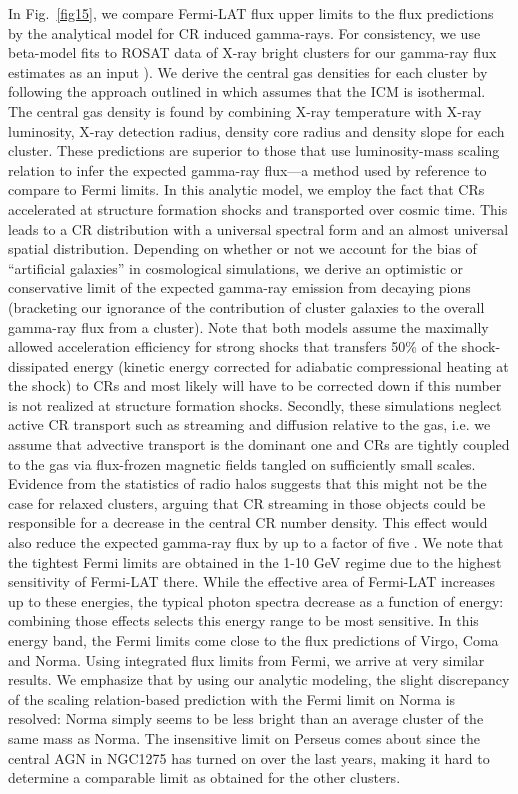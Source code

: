 \documentclass[10pt,aps,pra,reprint,amsmath,amsfonts,amssymb,showpacs,nofootinbib,floatfix]{revtex4-1}
\begin{document}
In Fig.~\ref{fig15}, we compare Fermi-LAT flux upper limits to the
flux predictions by the analytical model \cite{2010MNRAS.409..449P}
for CR induced gamma-rays. For consistency, we use beta-model fits to
ROSAT data of X-ray bright clusters for our gamma-ray flux estimates
as an input \cite{2002ApJ...567..716R}). We derive the central gas
densities for each cluster by following the approach outlined in
\cite{1999ApJ...517..627M} which assumes that the ICM is
isothermal. The central gas density is found by combining X-ray
temperature with X-ray luminosity, X-ray detection radius, density
core radius and density slope for each cluster. These predictions are
superior to those that use luminosity-mass scaling relation to infer
the expected gamma-ray flux---a method used by reference
\cite{2010ApJ...717L..71A} to compare to Fermi limits.  In this
analytic model, we employ the fact that CRs accelerated at structure
formation shocks and transported over cosmic time. This leads to a CR
distribution with a universal spectral form and an almost universal
spatial distribution. Depending on whether or not we account for the
bias of ``artificial galaxies'' in cosmological simulations, we derive
an optimistic or conservative limit of the expected gamma-ray emission
from decaying pions (bracketing our ignorance of the contribution of
cluster galaxies to the overall gamma-ray flux from a cluster). Note
that both models assume the maximally allowed acceleration efficiency
for strong shocks that transfers 50\% of the shock-dissipated energy
(kinetic energy corrected for adiabatic compressional heating at the
shock) to CRs and most likely will have to be corrected down if this
number is not realized at structure formation shocks. Secondly, these
simulations neglect active CR transport such as streaming and
diffusion relative to the gas, i.e. we assume that advective transport
is the dominant one and CRs are tightly coupled to the gas via
flux-frozen magnetic fields tangled on sufficiently small
scales. Evidence from the statistics of radio halos suggests that this
might not be the case for relaxed clusters, arguing that CR streaming
in those objects could be responsible for a decrease in the central CR
number density. This effect would also reduce the expected gamma-ray
flux by up to a factor of five \cite{2011A&A...527A..99E}. We note
that the tightest Fermi limits are obtained in the 1-10 GeV regime due
to the highest sensitivity of Fermi-LAT there. While the effective
area of Fermi-LAT increases up to these energies, the typical photon
spectra decrease as a function of energy: combining those effects
selects this energy range to be most sensitive.  In this energy band,
the Fermi limits come close to the flux predictions of Virgo, Coma and
Norma. Using integrated flux limits from Fermi, we arrive at very
similar results.  We emphasize that by using our analytic modeling,
the slight discrepancy of the scaling relation-based prediction with
the Fermi limit on Norma \cite{2010ApJ...717L..71A} is resolved: Norma
simply seems to be less bright than an average cluster of the same
mass as Norma. The insensitive limit on Perseus comes about since the
central AGN in NGC1275 has turned on over the last years, making it
hard to determine a comparable limit as obtained for the other
clusters.
\end{document}
